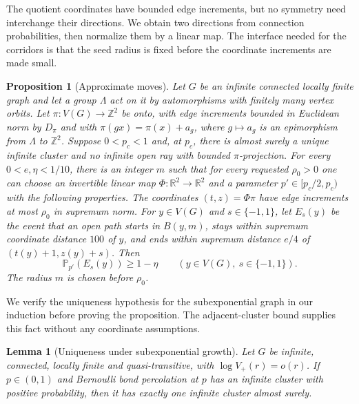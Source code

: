 \documentclass[11pt]{article}
\newtheorem{proposition}[theorem]{Proposition}
\newtheorem{lemma}[theorem]{Lemma}
\theoremstyle{definition}
\newcommand{\PP}{\mathbb P}
\newcommand{\pc}{p_c}
\begin{document}
The quotient coordinates have bounded edge increments, but no symmetry
need interchange their directions. We obtain two directions from
connection probabilities, then normalize them by a linear map. The
interface needed for the corridors is that the seed radius is fixed
before the coordinate increments are made small.

\begin{proposition}[Approximate moves]\label{prop:moves}
Let $G$ be an infinite connected locally finite graph and let a group
$\Lambda$ act on it by automorphisms with finitely many vertex orbits.
Let $\pi:V(G)\to\mathbb Z^2$ be onto, with edge increments
bounded in Euclidean norm by $D_\pi$ and with
$\pi(gx)=\pi(x)+a_g$, where
$g\mapsto a_g$ is an epimorphism from $\Lambda$ to $\mathbb Z^2$.
Suppose $0<\pc<1$ and, at $\pc$, there is almost surely a unique
infinite cluster and no infinite open ray with bounded $\pi$-projection.
For every \(0<e,\eta<1/10\), there is an integer \(m\) such that
for every requested \(\rho_0>0\) one can choose an invertible linear map
\(\Phi:\mathbb R^2\to\mathbb R^2\) and a parameter
\(p'\in[\pc/2,\pc)\) with the following properties.
The coordinates \((t,z)=\Phi\pi\) have edge increments at most
\(\rho_0\) in supremum norm. For $y\in V(G)$ and
$s\in\{-1,1\}$, let $E_s(y)$ be the event that an open path starts
in $B(y,m)$, stays within supremum coordinate distance $100$ of $y$,
and ends within supremum distance $e/4$ of
$(t(y)+1,z(y)+s)$. Then
\[
 \PP_{p'}(E_s(y))\ge1-\eta
 \qquad(y\in V(G),\ s\in\{-1,1\}).
\]
The radius $m$ is chosen before $\rho_0$.
\end{proposition}

We verify the uniqueness hypothesis for the subexponential graph in
our induction before proving the proposition. The adjacent-cluster
bound supplies this fact without any coordinate assumptions.

\begin{lemma}[Uniqueness under subexponential growth]\label{lem:uniqueness}
Let $G$ be infinite, connected, locally finite and quasi-transitive, with
$\log V_+(r)=o(r)$. If $p\in(0,1)$ and Bernoulli bond percolation at $p$
has an infinite cluster with positive probability, then it has exactly
one infinite cluster almost surely.
\end{lemma}
\end{document}
